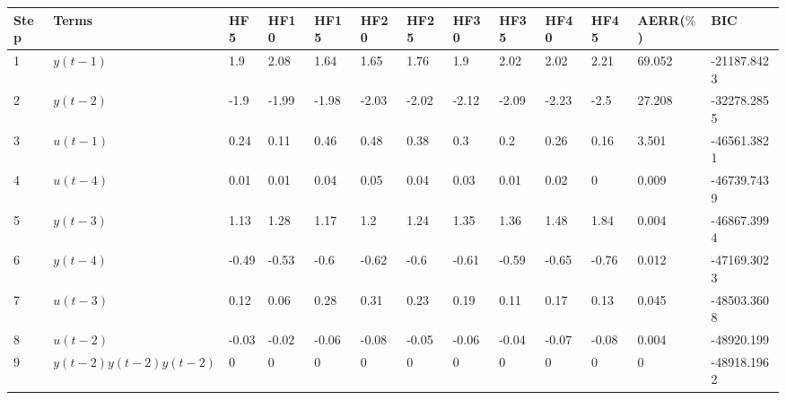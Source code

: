 \begin{tabular}{lllllllllllll}
Step & Terms & HF5 & HF10 & HF15 & HF20 & HF25 & HF30 & HF35 & HF40 & HF45 & AERR($\%$) & BIC \\ 
\hline 
1 & $y(t-1)$ & 1.9 & 2.08 & 1.64 & 1.65 & 1.76 & 1.9 & 2.02 & 2.02 & 2.21 & 69.052 & -21187.8423 \\ 
2 & $y(t-2)$ & -1.9 & -1.99 & -1.98 & -2.03 & -2.02 & -2.12 & -2.09 & -2.23 & -2.5 & 27.208 & -32278.2855 \\ 
3 & $u(t-1)$ & 0.24 & 0.11 & 0.46 & 0.48 & 0.38 & 0.3 & 0.2 & 0.26 & 0.16 & 3.501 & -46561.3821 \\ 
4 & $u(t-4)$ & 0.01 & 0.01 & 0.04 & 0.05 & 0.04 & 0.03 & 0.01 & 0.02 & 0 & 0.009 & -46739.7439 \\ 
5 & $y(t-3)$ & 1.13 & 1.28 & 1.17 & 1.2 & 1.24 & 1.35 & 1.36 & 1.48 & 1.84 & 0.004 & -46867.3994 \\ 
6 & $y(t-4)$ & -0.49 & -0.53 & -0.6 & -0.62 & -0.6 & -0.61 & -0.59 & -0.65 & -0.76 & 0.012 & -47169.3023 \\ 
7 & $u(t-3)$ & 0.12 & 0.06 & 0.28 & 0.31 & 0.23 & 0.19 & 0.11 & 0.17 & 0.13 & 0.045 & -48503.3608 \\ 
8 & $u(t-2)$ & -0.03 & -0.02 & -0.06 & -0.08 & -0.05 & -0.06 & -0.04 & -0.07 & -0.08 & 0.004 & -48920.199 \\ 
9 & $y(t-2)y(t-2)y(t-2)$ & 0 & 0 & 0 & 0 & 0 & 0 & 0 & 0 & 0 & 0 & -48918.1962 \\ 
\hline 
\end{tabular}